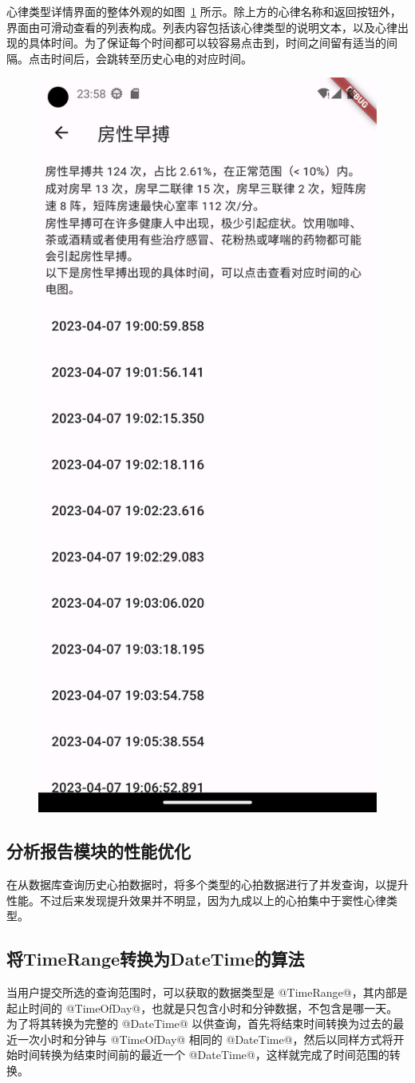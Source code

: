 心律类型详情界面的整体外观的如图~\ref{fig:label-details} 所示。除上方的心律名称和返回按钮外，界面由可滑动查看的列表构成。列表内容包括该心律类型的说明文本，以及心律出现的具体时间。为了保证每个时间都可以较容易点击到，时间之间留有适当的间隔。点击时间后，会跳转至历史心电的对应时间。

\begin{figure}[!ht]
    \centering
    \includegraphics[width=.33\textwidth]{../assets/label-details}
    \label{fig:label-details}
\end{figure}

\subsection{分析报告模块的性能优化}\label{subsec:analytics-performance}

在从数据库查询历史心拍数据时，将多个类型的心拍数据进行了并发查询，以提升性能。不过后来发现提升效果并不明显，因为九成以上的心拍集中于窦性心律类型。

\subsection{将TimeRange转换为DateTime的算法}\label{subsec:timerange-to-datetime}

当用户提交所选的查询范围时，可以获取的数据类型是 @TimeRange@，其内部是起止时间的 @TimeOfDay@，也就是只包含小时和分钟数据，不包含是哪一天。为了将其转换为完整的 @DateTime@ 以供查询，首先将结束时间转换为过去的最近一次小时和分钟与 @TimeOfDay@ 相同的 @DateTime@，然后以同样方式将开始时间转换为结束时间前的最近一个 @DateTime@，这样就完成了时间范围的转换。

